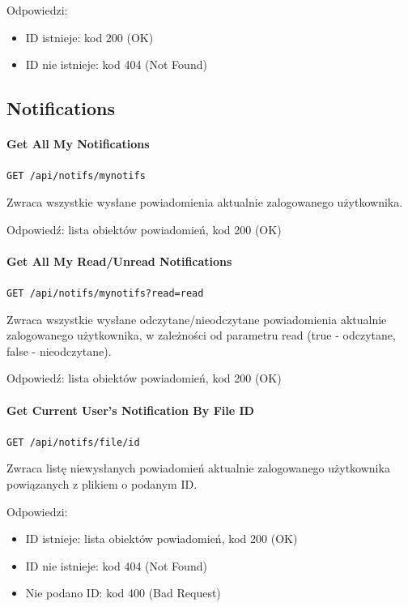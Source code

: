 \documentclass[a4paper,twoside,12pt]{book}
\begin{document}
Odpowiedzi: 
\begin{itemize}
	\item ID istnieje: kod 200 (OK) 
	\item ID nie istnieje: kod 404 (Not Found)
\end{itemize}

\subsection{Notifications}\label{notifications}

\paragraph{Get All My Notifications}\label{get-all-my-notifications}

\texttt{GET /api/notifs/mynotifs}

Zwraca wszystkie wysłane powiadomienia aktualnie zalogowanego użytkownika.

Odpowiedź: lista obiektów powiadomień, kod 200 (OK)

\paragraph{Get All My Read/Unread Notifications}\label{get-all-my-readunread-notifications}

\texttt{GET /api/notifs/mynotifs?read={read}}

Zwraca wszystkie wysłane odczytane/nieodczytane powiadomienia aktualnie zalogowanego użytkownika, w zależności od parametru read (true - odczytane, false - nieodczytane).

Odpowiedź: lista obiektów powiadomień, kod 200 (OK)

\paragraph{Get Current User's Notification By File ID}\label{get-current-users-notification-by-file-id}

\texttt{GET /api/notifs/file/{id}}

Zwraca listę niewysłanych powiadomień aktualnie zalogowanego użytkownika powiązanych z plikiem o podanym ID.

Odpowiedzi: 
\begin{itemize}
	\item ID istnieje: lista obiektów powiadomień, kod 200 (OK) 
	\item ID nie istnieje: kod 404 (Not Found) 
	\item Nie podano ID: kod 400 (Bad Request)
\end{itemize}
\end{document}
